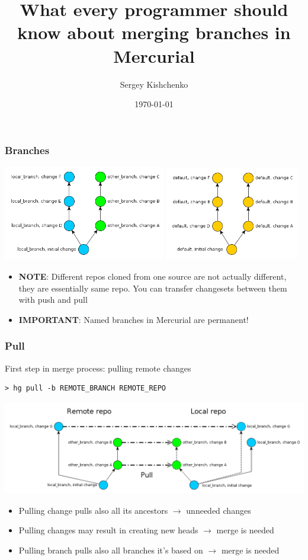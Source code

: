 \documentclass{beamer}
\title{What every programmer should know about merging branches in Mercurial}
\author{Sergey Kishchenko}
\date{\today}
\institute{Quickoffice}
\begin{document}
\frame{\titlepage}

\begin{frame} 
\frametitle{Branches}
\begin{multicols}{2}
\includegraphics[width=0.53\textwidth]{img/two_branches}
\columnbreak
{}
\includegraphics[width=0.44\textwidth]{img/two_default_branches}
\end{multicols}
\begin{itemize}
\item \textbf{NOTE}: Different repos cloned from one source are not actually different, they are essentially same repo. You can transfer changesets between them with push and pull
\item \textbf{IMPORTANT}: Named branches in Mercurial are permanent!
\end{itemize}
\end{frame}

\begin{frame}[fragile]
\frametitle{Pull}
\begin{exampleblock}{First step in merge process: pulling remote changes}
\begin{verbatim}
> hg pull -b REMOTE_BRANCH REMOTE_REPO
\end{verbatim}
\end{exampleblock}
\includegraphics[width=\textwidth]{img/pull_branches}
\begin{itemize}
\item Pulling change pulls also all its ancestors $\to$ unneeded changes
\item Pulling changes may result in creating new heads $\to$ merge is needed
\item Pulling branch pulls also all branches it's based on $\to$ merge is needed
\end{itemize}
\end{frame}
\end{document}
